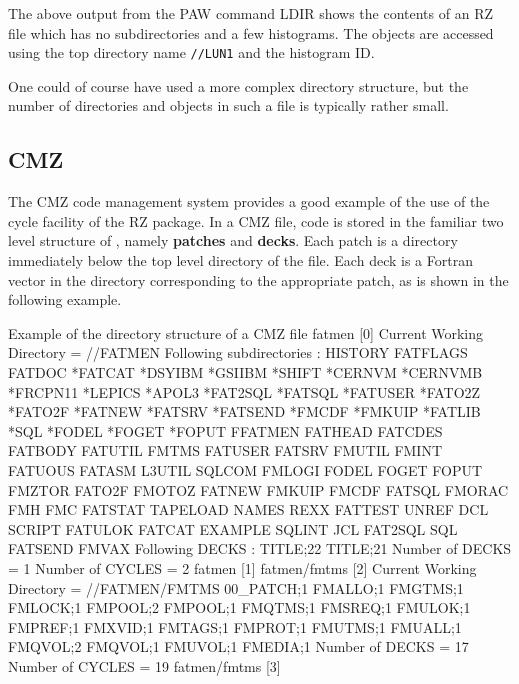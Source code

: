 The above output from the PAW command LDIR shows the contents
of an RZ file which has no subdirectories and a few histograms.
The objects are accessed using the top directory name {\tt //LUN1}
and the histogram ID. 

One could of course have used a more complex directory structure,
but the number of directories and objects in such a file is typically
rather small.

\newpage
\subsection{CMZ}

The CMZ code management system provides a good example of the use
of the cycle facility of the RZ package. In a CMZ file, code is
stored in the familiar two level structure of \PATCHY, namely
{\bf patches} and {\bf decks}. Each patch is a directory immediately
below the top level directory of the file. Each deck is a Fortran
vector in the directory corresponding to the appropriate
patch, as is shown in the following example.

\begin{XMPt}{Example of the directory structure of a CMZ file}
fatmen [0] 
 Current Working Directory = //FATMEN
 Following subdirectories :
  HISTORY           FATFLAGS          FATDOC            *FATCAT         
  *DSYIBM           *GSIIBM           *SHIFT            *CERNVM         
  *CERNVMB          *FRCPN11          *LEPICS           *APOL3          
  *FAT2SQL          *FATSQL           *FATUSER          *FATO2Z         
  *FATO2F           *FATNEW           *FATSRV           *FATSEND        
  *FMCDF            *FMKUIP           *FATLIB           *SQL            
  *FODEL            *FOGET            *FOPUT            FFATMEN         
  FATHEAD           FATCDES           FATBODY           FATUTIL         
  FMTMS             FATUSER           FATSRV            FMUTIL          
  FMINT             FATUOUS           FATASM            L3UTIL          
  SQLCOM            FMLOGI            FODEL             FOGET           
  FOPUT             FMZTOR            FATO2F            FMOTOZ          
  FATNEW            FMKUIP            FMCDF             FATSQL          
  FMORAC            FMH               FMC               FATSTAT         
  TAPELOAD          NAMES             REXX              FATTEST         
  UNREF             DCL               SCRIPT            FATULOK         
  FATCAT            EXAMPLE           SQLINT            JCL             
  FAT2SQL           SQL               FATSEND           FMVAX
Following DECKS :
 TITLE;22    TITLE;21    
 Number of DECKS =   1 Number of CYCLES =  2
 fatmen [1] 
 fatmen/fmtms [2] 
 Current Working Directory = //FATMEN/FMTMS
 00_PATCH;1  FMALLO;1    FMGTMS;1    FMLOCK;1    FMPOOL;2    FMPOOL;1    
 FMQTMS;1    FMSREQ;1    FMULOK;1    FMPREF;1    FMXVID;1    FMTAGS;1    
 FMPROT;1    FMUTMS;1    FMUALL;1    FMQVOL;2    FMQVOL;1    FMUVOL;1    
 FMEDIA;1    
 Number of DECKS =  17 Number of CYCLES =  19
 fatmen/fmtms [3]
\end{XMPt}

